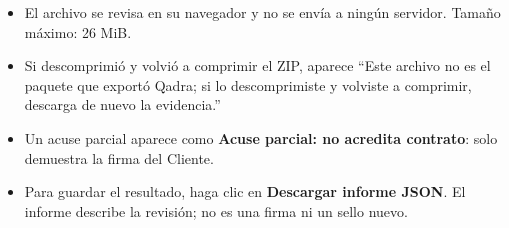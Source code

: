 \begin{itemize}
  \item El archivo se revisa en su navegador y no se envía a ningún
        servidor. Tamaño máximo: 26 MiB.
  \item Si descomprimió y volvió a comprimir el ZIP, aparece \enquote{Este
        archivo no es el paquete que exportó Qadra; si lo descomprimiste y
        volviste a comprimir, descarga de nuevo la evidencia.}
  \item Un acuse parcial aparece como \textbf{Acuse parcial: no acredita
        contrato}: solo demuestra la firma del Cliente.
  \item Para guardar el resultado, haga clic en
        \textbf{Descargar informe JSON}. El informe describe la revisión; no
        es una firma ni un sello nuevo.
\end{itemize}
